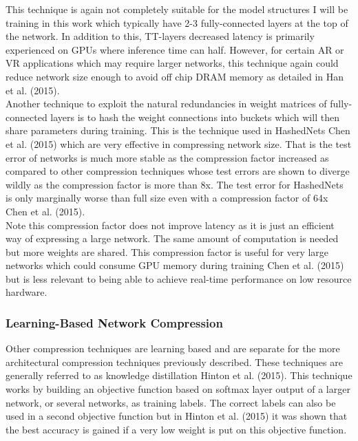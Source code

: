 \documentclass{article}
\begin{document}
This technique is again not completely suitable for the model structures I will be training in this work which typically have 2-3 fully-connected layers at the top of the network. In addition to this, TT-layers decreased latency is primarily experienced on GPUs where inference time can half. However, for certain AR or VR applications which may require larger networks, this technique again could reduce network size enough to avoid off chip DRAM memory as detailed in Han et al. (2015). \\

Another technique to exploit the natural redundancies in weight matrices of fully-connected layers is to hash the weight connections into buckets which will then share parameters during training. This is the technique used in HashedNets Chen et al. (2015) which are very effective in compressing network size. That is the test error of networks is much more stable as the compression factor increased as compared to other compression techniques whose test errors are shown to diverge wildly as the compression factor is more than 8x. The test error for HashedNets is only marginally worse than full size even with a compression factor of 64x Chen et al. (2015).\\

Note this compression factor does not improve latency as it is just an efficient way of expressing a large network. The same amount of computation is needed but more weights are shared. This compression factor is useful for very large networks which could consume GPU memory during training Chen et al. (2015) but is less relevant to being able to achieve real-time performance on low resource hardware. 

\subsubsection{Learning-Based Network Compression}
Other compression techniques are learning based and are separate for the more architectural compression techniques previously described. These techniques are generally referred to as knowledge distillation Hinton et al. (2015). This technique works by building an objective function based on softmax layer output of a larger network, or several networks, as training labels. The correct labels can also be used in a second objective function but in Hinton et al. (2015) it was shown that the best accuracy is gained if a very low weight is put on this objective function.\\
\end{document}
